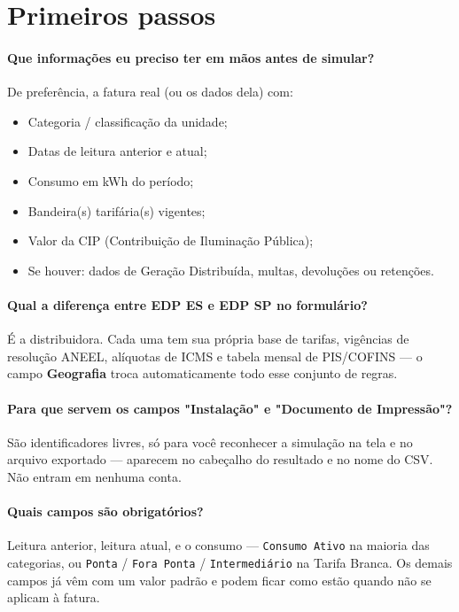 \documentclass[11pt,a4paper]{article}
\newcommand{\campo}[1]{\texttt{\small #1}}
\begin{document}
\section{Primeiros passos}

\paragraph{Que informações eu preciso ter em mãos antes de simular?}
De preferência, a fatura real (ou os dados dela) com:
\begin{itemize}
  \item Categoria / classificação da unidade;
  \item Datas de leitura anterior e atual;
  \item Consumo em kWh do período;
  \item Bandeira(s) tarifária(s) vigentes;
  \item Valor da CIP (Contribuição de Iluminação Pública);
  \item Se houver: dados de Geração Distribuída, multas, devoluções ou retenções.
\end{itemize}

\paragraph{Qual a diferença entre EDP ES e EDP SP no formulário?}
É a distribuidora. Cada uma tem sua própria base de tarifas, vigências de resolução ANEEL, alíquotas de ICMS e tabela mensal de PIS/COFINS --- o campo \textbf{Geografia} troca automaticamente todo esse conjunto de regras.

\paragraph{Para que servem os campos "Instalação" e "Documento de Impressão"?}
São identificadores livres, só para você reconhecer a simulação na tela e no arquivo exportado --- aparecem no cabeçalho do resultado e no nome do CSV. Não entram em nenhuma conta.

\paragraph{Quais campos são obrigatórios?}
Leitura anterior, leitura atual, e o consumo --- \campo{Consumo Ativo} na maioria das categorias, ou \campo{Ponta} / \campo{Fora Ponta} / \campo{Intermediário} na Tarifa Branca. Os demais campos já vêm com um valor padrão e podem ficar como estão quando não se aplicam à fatura.
\end{document}
